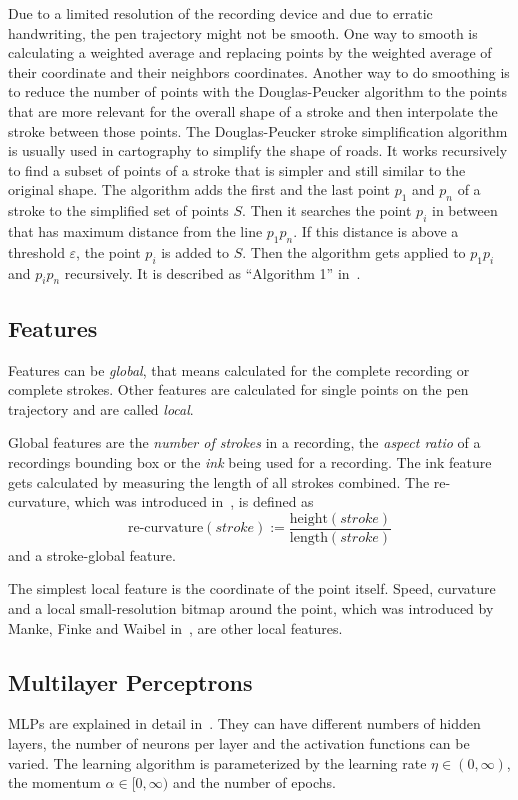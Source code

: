 Due to a limited resolution of the recording device and due to erratic
handwriting, the pen trajectory might not be smooth. One way to smooth is
calculating a weighted average and replacing points by the weighted average of
their coordinate and their neighbors coordinates. Another way to do smoothing
is to reduce the number of points with the Douglas-Peucker
algorithm to the points that are more relevant for the
overall shape of a stroke and then interpolate the stroke between those points.
The Douglas-Peucker stroke simplification algorithm is usually used in
cartography to simplify the shape of roads. It works recursively to find a
subset of points of a stroke that is simpler and still similar to the original
shape. The algorithm adds the first and the last point $p_1$ and $p_n$ of a
stroke to the simplified set of points $S$. Then it searches the point $p_i$ in
between that has maximum distance from the line $p_1 p_n$. If this distance is
above a threshold $\varepsilon$, the point $p_i$ is added to $S$. Then the
algorithm gets applied to $p_1 p_i$ and $p_i p_n$ recursively. It is described
as \enquote{Algorithm 1} in~\cite{Visvalingam1990}.

\subsection{Features}\label{sec:features}
Features can be \textit{global}, that means calculated for the complete
recording or complete strokes. Other features are calculated for single points
on the pen trajectory and are called \textit{local}.

Global features are the \textit{number of strokes} in a recording, the
\textit{aspect ratio} of a recordings bounding box or the
\textit{ink} being used for a recording. The ink feature gets calculated by
measuring the length of all strokes combined. The re-curvature, which was
introduced in~\cite{Huang06}, is defined as
\[\text{re-curvature}(stroke) := \frac{\text{height}(stroke)}{\text{length}(stroke)}\]
and a stroke-global feature.

The simplest local feature is the coordinate of the point itself. Speed,
curvature and a local small-resolution bitmap around the point, which was
introduced by Manke, Finke and Waibel in~\cite{Manke1995}, are other local
features.

\subsection{Multilayer Perceptrons}\label{sec:mlp-training}
\Glspl{MLP} are explained in detail in~\cite{Mitchell97}. They can have
different numbers of hidden layers, the number of neurons per layer and the
activation functions can be varied. The learning algorithm is parameterized by
the learning rate $\eta \in (0, \infty)$, the momentum $\alpha \in [0, \infty)$
and the number of epochs.

